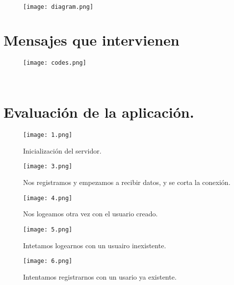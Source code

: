 \documentclass[a4paper, 11pt]{article}
\begin{document}
\begin{figure}[h]
\center
\texttt{[image: diagram.png]}
\end{figure}

\section{Mensajes que intervienen}
\begin{figure}[h]
\center
\texttt{[image: codes.png]}
\end{figure}
\
\section{Evaluación de la aplicación.}

\begin{figure}[h]
\center
\texttt{[image: 1.png]}
\caption{Inicialización del servidor.}
\texttt{[image: 3.png]}
\caption{Nos registramos y empezamos a recibir datos, y se corta la conexión.}
\texttt{[image: 4.png]}
\caption{Nos logeamos otra vez con el usuario creado.}
\end{figure}
\newpage
\begin{figure}[t]
\center
\texttt{[image: 5.png]}
\caption{Intetamos logearnos con un usuairo inexistente.}
\texttt{[image: 6.png]}
\caption{Intentamos registrarnos con un usario ya existente.}

\end{figure}
\end{document}
